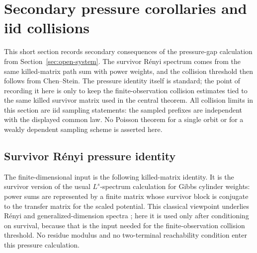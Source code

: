 \section{Secondary pressure corollaries and iid collisions}\label{sec:double-budget}

This short section records secondary consequences of the pressure-gap
calculation from Section~\ref{sec:open-system}.  The survivor
R\'enyi spectrum comes from the same killed-matrix path sum with power
weights, and the collision threshold then follows from Chen--Stein.  The
pressure identity itself is standard; the point of recording it here is
only to keep the finite-observation collision estimates tied to the same
killed survivor matrix used in the central theorem.  All collision
limits in this section are iid sampling statements: the sampled prefixes
are independent with the displayed common law.  No Poisson theorem for a
single orbit or for a weakly dependent sampling scheme is asserted here.

\subsection{Survivor R\'enyi pressure identity}

The finite-dimensional input is the following killed-matrix identity.
It is the survivor version of the usual \(L^s\)-spectrum calculation for
Gibbs cylinder weights: power sums are represented by a finite matrix
whose survivor block is conjugate to the transfer matrix for the scaled
potential.  This classical viewpoint underlies R\'enyi and
generalized-dimension spectra
\citep{Renyi1961,HentschelProcaccia1983,Pesin1997}; here it is used only
after conditioning on survival, because that is the input needed for the
finite-observation collision threshold.  No residue modulus and no
two-terminal reachability condition enter this pressure calculation.

